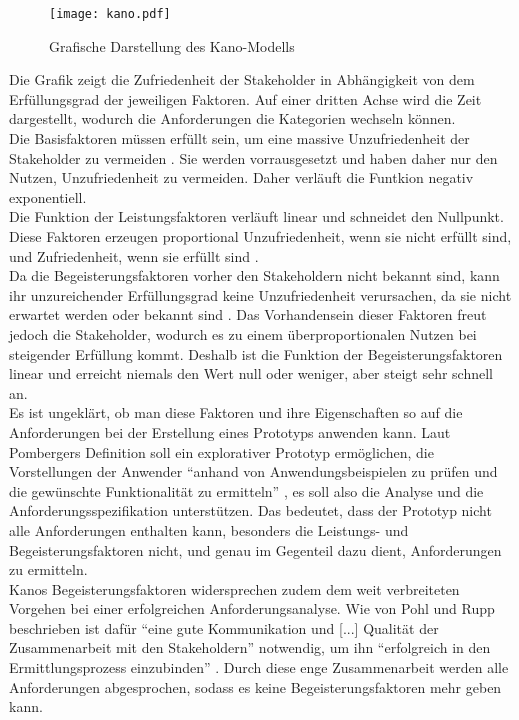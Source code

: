 \documentclass [12pt, a4paper, oneside, titlepage, ngerman]{article}
\begin{document}
\begin{figure}[H]
	\centering
	\texttt{[image: kano.pdf]}
	\caption{Grafische Darstellung des Kano-Modells}
	\label{img:kano}
\end{figure}
\noindent Die Grafik zeigt die Zufriedenheit der Stakeholder in Abhängigkeit von dem Erfüllungsgrad der jeweiligen Faktoren. Auf einer dritten Achse wird die Zeit dargestellt, wodurch die Anforderungen die Kategorien wechseln können. \\
Die Basisfaktoren müssen erfüllt sein, um eine massive Unzufriedenheit der Stakeholder zu vermeiden \cite[vgl. S.106]{Kano}. Sie werden vorrausgesetzt und haben daher nur den Nutzen, Unzufriedenheit zu vermeiden. Daher verläuft die Funtkion negativ exponentiell. \\
Die Funktion der Leistungsfaktoren verläuft linear und schneidet den Nullpunkt. Diese Faktoren erzeugen proportional Unzufriedenheit, wenn sie nicht erfüllt sind, und Zufriedenheit, wenn sie erfüllt sind \cite[vgl. S.106]{Kano}. \\
Da die Begeisterungsfaktoren vorher den Stakeholdern nicht bekannt sind, kann ihr unzureichender Erfüllungsgrad keine Unzufriedenheit verursachen, da sie nicht erwartet werden oder bekannt sind \cite[vgl. S.106]{Kano}. Das Vorhandensein dieser Faktoren freut jedoch die Stakeholder, wodurch es zu einem überproportionalen Nutzen bei steigender Erfüllung kommt. Deshalb ist die Funktion der Begeisterungsfaktoren linear und erreicht niemals den Wert null oder weniger, aber steigt sehr schnell an. \\

\noindent Es ist ungeklärt, ob man diese Faktoren und ihre Eigenschaften so auf die Anforderungen bei der Erstellung eines Prototyps anwenden kann. Laut Pombergers Definition soll ein explorativer Prototyp ermöglichen, die Vorstellungen der Anwender "`anhand von Anwendungsbeispielen zu prüfen und die gewünschte Funktionalität zu ermitteln"' \cite[S.27]{pomberger2004}, es soll also die Analyse und die Anforderungsspezifikation unterstützen. Das bedeutet, dass der Prototyp nicht alle Anforderungen enthalten kann, besonders die Leistungs- und Begeisterungsfaktoren nicht, und genau im Gegenteil dazu dient, Anforderungen zu ermitteln. \\
Kanos Begeisterungsfaktoren widersprechen zudem dem weit verbreiteten Vorgehen bei einer erfolgreichen Anforderungsanalyse. Wie von Pohl und Rupp beschrieben ist dafür "`eine gute Kommunikation und [...] Qualität der Zusammenarbeit mit den Stakeholdern"' \cite[S.33]{PohlRupp2015} notwendig, um ihn "`erfolgreich in den Ermittlungsprozess einzubinden"' \cite[S.34]{PohlRupp2015}. Durch diese enge Zusammenarbeit werden alle Anforderungen abgesprochen, sodass es keine Begeisterungsfaktoren mehr geben kann.
\end{document}
